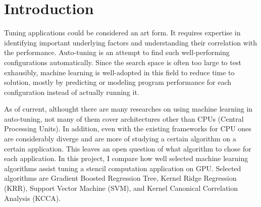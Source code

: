 \section{Introduction} %

Tuning applications could be considered an art form. It requires expertise in identifying important underlying factors and understanding their correlation with the performance. Auto-tuning is an attempt to find such well-performing configurations automatically. Since the search space is often too large to test exhausibly, machine learning is well-adopted in this field to reduce time to solution, mostly by predicting or modeling program performance for each configuration instead of actually running it.

As of current, althought there are many researches on using machine learning in auto-tuning, not many of them cover architectures other than CPUs (Central Processing Units). In addition, even with the existing frameworks for CPU ones are considerably diverge and are more of studying a certain algorithm on a certain application. This leaves an open question of what algorithm to chose for each application. In this project, I compare how well selected machine learning algorithms assist tuning a stencil computation application on GPU. Selected algorithms are Gradient Boosted Regression Tree, Kernel Ridge Regression (KRR), Support Vector Machine (SVM), and Kernel Canonical Correlation Analysis (KCCA).

